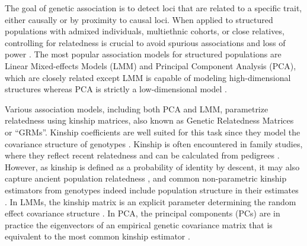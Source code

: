 \documentclass[11pt]{article}
\begin{document}
The goal of genetic association is to detect loci that are related to a specific trait, either causally or by proximity to causal loci.
When applied to structured populations with admixed individuals, multiethnic cohorts, or close relatives, controlling for relatedness is crucial to avoid spurious associations and loss of power \citep{devlin_genomic_1999, voight_confounding_2005, astle_population_2009, yao_limitations_2022}.
The most popular association models for structured populations are Linear Mixed-effects Models (LMM) and Principal Component Analysis (PCA), which are closely related except LMM is capable of modeling high-dimensional structures whereas PCA is strictly a low-dimensional model \citep{astle_population_2009, hoffman_correcting_2013, yao_limitations_2022}.

Various association models, including both PCA and LMM, parametrize relatedness using kinship matrices, also known as Genetic Relatedness Matrices or ``GRMs''.
Kinship coefficients are well suited for this task since they model the covariance structure of genotypes \citep{malecot_mathematiques_1948, jacquard_structures_1970}.
Kinship is often encountered in family studies, where they reflect recent relatedness and can be calculated from pedigrees \citep{wright_coefficients_1922, emik_systematic_1949, garcia-cortes_novel_2015}.
However, as kinship is defined as a probability of identity by descent, it may also capture ancient population relatedness \citep{malecot_mathematiques_1948, astle_population_2009}, and common non-parametric kinship estimators from genotypes indeed include population structure in their estimates \citep{ochoa_estimating_2021}.
In LMMs, the kinship matrix is an explicit parameter determining the random effect covariance structure \citep{xie_combining_1998,yu_unified_2006, aulchenko_genomewide_2007, astle_population_2009, kang_efficient_2008, kang_variance_2010, zhou_genome-wide_2012, yang_advantages_2014, loh_efficient_2015, sul_population_2018}.
In PCA, the principal components (PCs) are in practice the eigenvectors of an empirical genetic covariance matrix that is equivalent to the most common kinship estimator \citep{price_principal_2006, astle_population_2009, hoffman_correcting_2013, yao_limitations_2022}.
\end{document}
